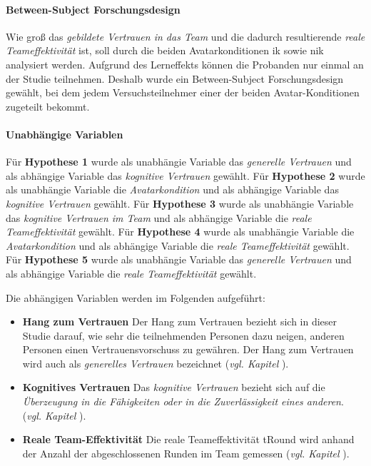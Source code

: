 \documentclass[a4paper,11pt]{article}%
\renewcommand{\\}{\vspace*{0.5\baselineskip} \newline}
\begin{document}
			\paragraph{Between-Subject Forschungsdesign}
Wie groß das \textit{gebildete Vertrauen in das Team} und die dadurch resultierende \textit{reale Teameffektivität} ist, soll durch die beiden Avatarkonditionen \ac{ik} sowie \ac{nik} analysiert werden. Aufgrund des Lerneffekts können die Probanden nur einmal an der Studie teilnehmen. Deshalb wurde ein Between-Subject Forschungsdesign gewählt, bei dem jedem Versuchsteilnehmer einer der beiden Avatar-Konditionen zugeteilt bekommt.
			\paragraph{Unabhängige Variablen}
Für \textbf{Hypothese 1} wurde als unabhängie Variable das \textit{generelle Vertrauen} und als abhängige Variable das \textit{kognitive Vertrauen} gewählt.
Für \textbf{Hypothese 2} wurde als unabhängie Variable die \textit{Avatarkondition} und als abhängige Variable das \textit{kognitive Vertrauen} gewählt.
Für \textbf{Hypothese 3} wurde als unabhängie Variable das \textit{kognitive Vertrauen im Team} und als abhängige Variable die \textit{reale Teameffektivität} gewählt.
Für \textbf{Hypothese 4} wurde als unabhängie Variable die \textit{Avatarkondition} und als abhängige Variable die \textit{reale Teameffektivität} gewählt.
Für \textbf{Hypothese 5} wurde als unabhängie Variable das \textit{generelle Vertrauen} und als abhängige Variable die \textit{reale Teameffektivität} gewählt.

Die abhängigen Variablen werden im Folgenden aufgeführt:
\begin{itemize}
\item \textbf{Hang zum Vertrauen} Der Hang zum Vertrauen bezieht sich in dieser Studie darauf, wie sehr die teilnehmenden Personen dazu neigen, anderen Personen einen Vertrauensvorschuss zu gewähren. Der Hang zum Vertrauen wird auch als \textit{generelles Vertrauen} bezeichnet \citep[p.30]{mcallister1995affect} (\textit{vgl. Kapitel }).
\item \textbf{Kognitives Vertrauen} Das \textit{kognitive Vertrauen} bezieht sich auf die \textit{Überzeugung in die Fähigkeiten oder in die Zuverlässigkeit eines anderen}. \citep[p.30]{mcallister1995affect} (\textit{vgl. Kapitel }).
\item \textbf{Reale Team-Effektivität} Die reale Teameffektivität \ac{tRound} wird anhand der Anzahl der abgeschlossenen Runden im Team gemessen (\textit{vgl. Kapitel }).
\end{itemize}
\end{document}
